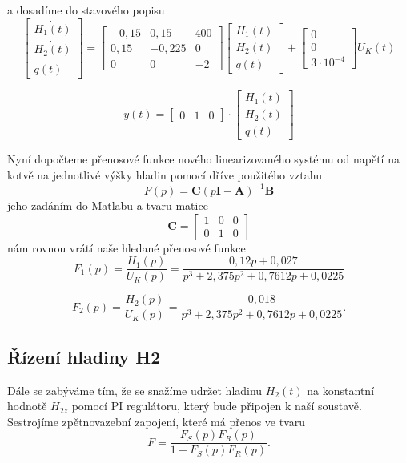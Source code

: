 \documentclass{article}
\begin{document}
			a dosadíme do stavového popisu
			\[\begin{bmatrix}
				\dot{H_1(t)}\\
				\dot{H_2(t)}\\
				\dot{q(t)}
			\end{bmatrix} = 
			\begin{bmatrix}
				-0,15&0,15&400\\
				0,15&-0,225&0\\
				0&0&-2
			\end{bmatrix}
			\begin{bmatrix}
				H_1(t)\\
				H_2(t)\\
				q(t)
			\end{bmatrix}+
			\begin{bmatrix}
				0\\
				0\\
				3\cdot10^{-4}
			\end{bmatrix} U_{K}(t)\]
		
			\[y(t)=
			\begin{bmatrix}
				0&1&0
			\end{bmatrix}\cdot
			\begin{bmatrix}
				H_1(t)\\
				H_2(t)\\
				q(t)
			\end{bmatrix}\]
		
		Nyní dopočteme přenosové funkce nového linearizovaného systému od napětí na kotvě na jednotlivé výšky hladin pomocí dříve použitého vztahu
		\[F(p)=\textbf{C}(p \textbf{I}-\textbf{A})^{-1}\textbf{B}\]
		jeho zadáním do Matlabu a tvaru matice \[\textbf{C}=\begin{bmatrix}
			1&0&0\\
			0&1&0
		\end{bmatrix}\]
		nám rovnou vrátí naše hledané přenosové funkce
		\[F_{1}(p)=\frac{H_{1}(p)}{U_{K}(p)}=\frac{0,12 p + 0,027}{p^3 + 2,375 p^2 + 0,7612p + 0,0225}\]
		
		\[F_{2}(p)=\frac{H_{2}(p)}{U_{K}(p)}=\frac{0,018}{p^3 + 2,375 p^2 + 0,7612p + 0,0225}.\]
		
		\subsection{Řízení hladiny H2}
			Dále se zabýváme tím, že se snažíme udržet hladinu $H_2(t)$ na konstantní hodnotě $H_{2z}$ pomocí PI regulátoru, který bude připojen k naší soustavě. Sestrojíme zpětnovazební zapojení, které má přenos ve tvaru 
			\[F=\frac{F_S(p)F_R(p)}{1+F_S(p)F_R(p)}.\]
			
\end{document}
